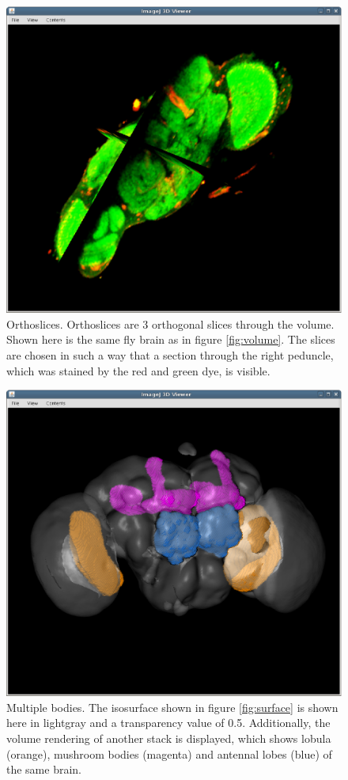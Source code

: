 \documentclass[a4paper,10pt]{article}
\begin{document}
\begin{figure}[m]
\includegraphics[width=\textwidth]{images/orthoslices.eps}
\caption{Orthoslices. Orthoslices are 3 orthogonal slices through the volume. Shown here is the same fly brain as in figure \ref{fig:volume}. The slices are chosen in such a way that a section through the right peduncle, which was stained by the red and green dye, is visible.}
\label{fig:orthoslices}
\end{figure}

\begin{figure}[m]
\includegraphics[width=\textwidth]{images/multiple.eps}
\caption{Multiple bodies. The isosurface shown in figure \ref{fig:surface} is shown here in lightgray and a transparency value of 0.5. Additionally, the volume rendering of another stack is displayed, which shows lobula (orange), mushroom bodies (magenta) and antennal lobes (blue) of the same brain.}
\label{fig:multiple}
\end{figure}
\end{document}
